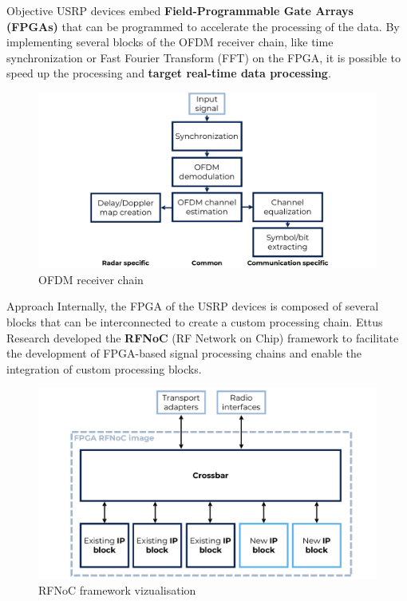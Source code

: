 \documentclass[final]{beamer}
\newlength{\onecolwid}
\begin{document}
\begin{frame}[t,fragile]
\begin{columns}[t]
\begin{column}{\onecolwid}

  \begin{block}{Objective}
    USRP devices embed \textbf{Field-Programmable Gate Arrays (FPGAs)} that can be programmed to accelerate the processing of the data. By implementing several blocks of the OFDM receiver chain, like time synchronization or Fast Fourier Transform (FFT) on the FPGA, it is possible to speed up the processing and \textbf{target real-time data processing}.

    \begin{figure}[!ht]
      \centering
      \includegraphics[width=\linewidth]{img/ofdm_reciever_chain.pdf}
      \caption{OFDM receiver chain}
    \end{figure}
  \end{block}

  \vspace{-0.8in}

  \begin{block}{Approach}
    Internally, the FPGA of the USRP devices is composed of several blocks that can be interconnected to create a custom processing chain. Ettus Research developed the \textbf{RFNoC} (RF Network on Chip) framework to facilitate the development of FPGA-based signal processing chains and enable the integration of custom processing blocks.

    \begin{figure}[!ht]
      \centering
      \includegraphics[width=\linewidth]{img/RFNoC.pdf}
      \caption{RFNoC framework vizualisation}
    \end{figure}


\end{block}
\end{column}
\end{columns}
\end{frame}
\end{document}
